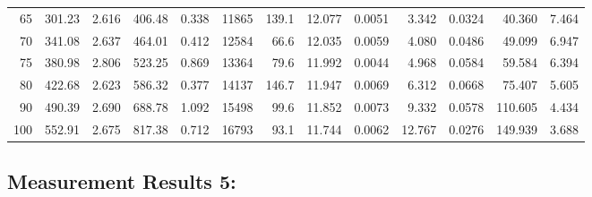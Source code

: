 \documentclass[10pt]{article}
\begin{document}
{\begin{tabular}{|r|rr|rr|rr|rr|rr|r|r|}
       65 &       301.23 &        2.616 &       406.48 &        0.338 &        11865 &        139.1 &       12.077 &       0.0051 &        3.342 &       0.0324 &       40.360 &        7.464 \\
       70 &       341.08 &        2.637 &       464.01 &        0.412 &        12584 &         66.6 &       12.035 &       0.0059 &        4.080 &       0.0486 &       49.099 &        6.947 \\
       75 &       380.98 &        2.806 &       523.25 &        0.869 &        13364 &         79.6 &       11.992 &       0.0044 &        4.968 &       0.0584 &       59.584 &        6.394 \\
       80 &       422.68 &        2.623 &       586.32 &        0.377 &        14137 &        146.7 &       11.947 &       0.0069 &        6.312 &       0.0668 &       75.407 &        5.605 \\
       90 &       490.39 &        2.690 &       688.78 &        1.092 &        15498 &         99.6 &       11.852 &       0.0073 &        9.332 &       0.0578 &      110.605 &        4.434 \\
      100 &       552.91 &        2.675 &       817.38 &        0.712 &        16793 &         93.1 &       11.744 &       0.0062 &       12.767 &       0.0276 &      149.939 &        3.688 \\
\hline
\end{tabular}
}



\subsection*{\large \bf Measurement Results 5:}
\end{document}
